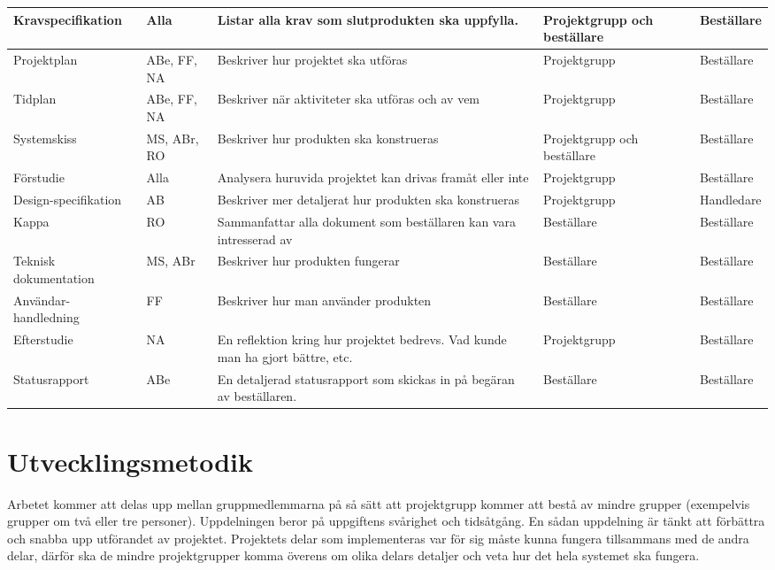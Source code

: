 \documentclass[11pt]{article}
\begin{document}
\begin{flushleft}
\begin{center}
\begin{longtable}{|p{.28\linewidth}|p{.1\linewidth}|p{.25\linewidth}|p{.19\linewidth}|p{.15\linewidth}|}
Kravspecifikation & Alla & Listar alla krav som slutprodukten ska uppfylla. & Projektgrupp och beställare & Beställare \\ \hline
Projektplan & ABe, FF, NA & Beskriver hur projektet ska utföras & Projektgrupp & Beställare \\ \hline
Tidplan & ABe, FF, NA & Beskriver när aktiviteter ska utföras och av vem & Projektgrupp & Beställare \\ \hline
Systemskiss & MS, ABr, RO & Beskriver hur produkten ska konstrueras& Projektgrupp och beställare & Beställare \\ \hline
Förstudie & Alla & Analysera huruvida projektet kan drivas framåt eller inte & Projektgrupp & Beställare \\ \hline
Design-specifikation & AB & Beskriver mer detaljerat hur produkten ska konstrueras & Projektgrupp & Handledare \\ \hline
Kappa & RO & Sammanfattar alla dokument som beställaren kan vara intresserad av & Beställare & Beställare \\ \hline
Teknisk dokumentation & MS, ABr & Beskriver hur produkten fungerar & Beställare & Beställare \\ \hline
Användar-handledning & FF & Beskriver hur man använder produkten& Beställare & Beställare \\ \hline
Efterstudie & NA & En reflektion kring hur projektet bedrevs. Vad kunde man ha gjort bättre, etc.& Projektgrupp & Beställare\\ \hline
Statusrapport & ABe & En detaljerad statusrapport som skickas in på begäran av beställaren. & Beställare & Beställare\\ \hline

\end{longtable}
\end{center}
\pagebreak

\section{Utvecklingsmetodik}
Arbetet kommer att delas upp mellan gruppmedlemmarna på så sätt att projektgrupp kommer att bestå av mindre grupper (exempelvis grupper om två eller tre personer). Uppdelningen beror på uppgiftens svårighet och tidsåtgång. En sådan uppdelning är tänkt att förbättra och snabba upp utförandet av projektet. Projektets delar som implementeras var för sig måste kunna fungera tillsammans med de andra delar, därför ska de mindre projektgrupper komma överens om olika delars detaljer och veta hur det hela systemet ska fungera.



\end{flushleft}
\end{document}
